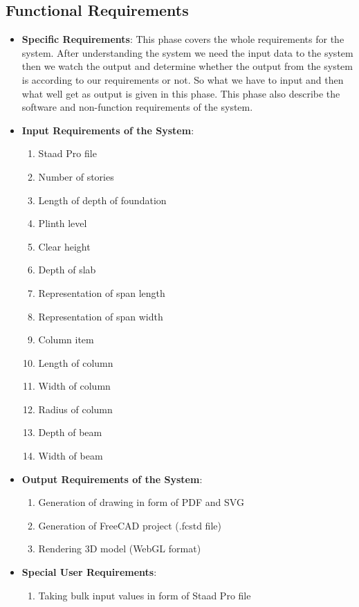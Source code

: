 \subsection{Functional Requirements}
\begin{itemize}
\item \textbf{Specific Requirements}: This phase covers the whole requirements for the system. After
understanding the system we need the input data to the system then we watch the output
and determine whether the output from the system is according to our requirements or not.
So what we have to input and then what well get as output is given in this phase. This phase
also describe the software and non-function requirements of the system.

\item \textbf{Input Requirements of the System}:
\begin{enumerate}
\item Staad Pro file
\item Number of stories
\item Length of depth of foundation
\item Plinth level
\item Clear height
\item Depth of slab
\item Representation of span length
\item Representation of span width
\item Column item
\item Length of column
\item Width of column
\item Radius of column
\item Depth of beam
\item Width of beam
\end{enumerate}
\vskip 0.5cm 
\item \textbf{Output Requirements of the System}:
\begin{enumerate} 
\item Generation of drawing in form of PDF and SVG
\item Generation of FreeCAD project (.fcstd file)
\item Rendering 3D model (WebGL format)
\end{enumerate}
\vskip 0.5cm 
\item \textbf{Special User Requirements}:
\begin{enumerate} 
\item Taking bulk input values in form of Staad Pro file

\end{enumerate}
\end{itemize}
